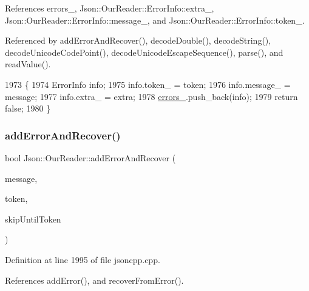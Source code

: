 References errors\+\_\+, Json\+::\+Our\+Reader\+::\+Error\+Info\+::extra\+\_\+, Json\+::\+Our\+Reader\+::\+Error\+Info\+::message\+\_\+, and Json\+::\+Our\+Reader\+::\+Error\+Info\+::token\+\_\+.



Referenced by add\+Error\+And\+Recover(), decode\+Double(), decode\+String(), decode\+Unicode\+Code\+Point(), decode\+Unicode\+Escape\+Sequence(), parse(), and read\+Value().


\begin{DoxyCode}
1973                                                                                \{
1974   ErrorInfo info;
1975   info.token\_ = token;
1976   info.message\_ = message;
1977   info.extra\_ = extra;
1978   \hyperlink{class_json_1_1_our_reader_afb76b68ba1ab68fe09cf2838e3d4898d}{errors\_}.push\_back(info);
1979   \textcolor{keywordflow}{return} \textcolor{keyword}{false};
1980 \}
\end{DoxyCode}
\mbox{\label{class_json_1_1_our_reader_a074cf3d91e9404fe89e03cfc6a43e6fb}} 
\subsubsection{\texorpdfstring{add\+Error\+And\+Recover()}{addErrorAndRecover()}}
{\footnotesize\ttfamily bool Json\+::\+Our\+Reader\+::add\+Error\+And\+Recover (\begin{DoxyParamCaption}\item[{const \hyperlink{json_8h_a1e723f95759de062585bc4a8fd3fa4be}{J\+S\+O\+N\+C\+P\+P\+\_\+\+S\+T\+R\+I\+NG} \&}]{message,  }\item[{\hyperlink{class_json_1_1_our_reader_1_1_token}{Token} \&}]{token,  }\item[{\hyperlink{class_json_1_1_our_reader_a15116f7276ddf1e7a2cc3cbefa884dcc}{Token\+Type}}]{skip\+Until\+Token }\end{DoxyParamCaption})\hspace{0.3cm}{\ttfamily [private]}}



Definition at line 1995 of file jsoncpp.\+cpp.



References add\+Error(), and recover\+From\+Error().



